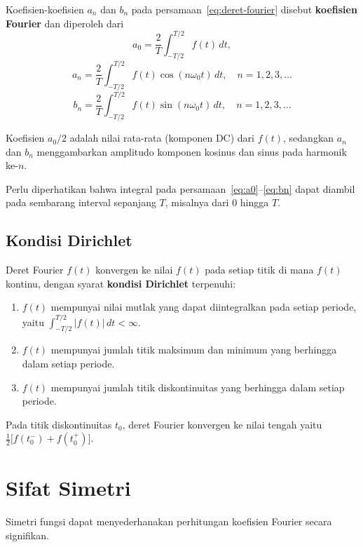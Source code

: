 Koefisien-koefisien $a_n$ dan $b_n$ pada persamaan~\ref{eq:deret-fourier} disebut \textbf{koefisien Fourier} dan diperoleh dari
\begin{equation}
a_0 = \frac{2}{T}\int_{-T/2}^{T/2} f(t)\,dt,
\label{eq:a0}
\end{equation}
\begin{equation}
a_n = \frac{2}{T}\int_{-T/2}^{T/2} f(t)\cos(n\omega_0 t)\,dt, \quad n = 1,2,3,\ldots
\label{eq:an}
\end{equation}
\begin{equation}
b_n = \frac{2}{T}\int_{-T/2}^{T/2} f(t)\sin(n\omega_0 t)\,dt, \quad n = 1,2,3,\ldots
\label{eq:bn}
\end{equation}

Koefisien $a_0/2$ adalah nilai rata-rata (komponen DC) dari $f(t)$, sedangkan $a_n$ dan $b_n$ menggambarkan amplitudo komponen kosinus dan sinus pada harmonik ke-$n$.

Perlu diperhatikan bahwa integral pada persamaan~\ref{eq:a0}--\ref{eq:bn} dapat diambil pada sembarang interval sepanjang $T$, misalnya dari $0$ hingga $T$.

\subsection{Kondisi Dirichlet}

Deret Fourier $f(t)$ konvergen ke nilai $f(t)$ pada setiap titik di mana $f(t)$ kontinu, dengan syarat \textbf{kondisi Dirichlet} terpenuhi:
\begin{enumerate}
\item $f(t)$ mempunyai nilai mutlak yang dapat diintegralkan pada setiap periode, yaitu $\int_{-T/2}^{T/2}|f(t)|\,dt < \infty$.
\item $f(t)$ mempunyai jumlah titik maksimum dan minimum yang berhingga dalam setiap periode.
\item $f(t)$ mempunyai jumlah titik diskontinuitas yang berhingga dalam setiap periode.
\end{enumerate}
Pada titik diskontinuitas $t_0$, deret Fourier konvergen ke nilai tengah yaitu $\frac{1}{2}\bigl[f(t_0^-)+f(t_0^+)\bigr]$.

\section{Sifat Simetri}

Simetri fungsi dapat menyederhanakan perhitungan koefisien Fourier secara signifikan.

